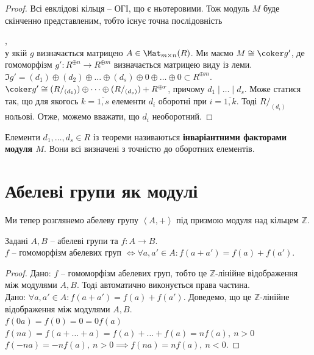 \documentclass{math_library}
\begin{document}
\begin{proof}
Всі евклідові кільця -- ОГІ, що є ньотеровими. Тож модуль $M$ буде скінченно представленим, тобто існує точна послідовність\\ ,\\
у якій $g$ визначається матрицею $A \in \Mat_{m \times n}(R)$. Ми маємо $M \cong \coker g'$, де гомоморфізм $g' \colon R^{\oplus n} \to R^{\oplus m}$ визначається матрицею виду із леми.\\
$\Im g' = (d_1) \oplus (d_2) \oplus \dots \oplus (d_s) \oplus 0 \oplus \dots \oplus 0 \subset R^{\oplus m}$.\\
$\coker g' \cong (R/_{(d_1)}) \oplus \dots \oplus (R/_{(d_s)}) + R^{\oplus r}$, причому $d_1 \mid \dots \mid d_s$. Може статися так, що для якогось $k = \overline{1,s}$ елементи $d_i$ оборотні при $i = \overline{1,k}$. Тоді $R/_{(d_i)}$ нольові. Отже, можемо вважати, що $d_i$ необоротний.
\end{proof}

\begin{definition}
Елементи $d_1,\dots,d_s \in R$ із теореми називаються \textbf{інваріантними факторами модуля $M$}. Вони всі визначені з точністю до оборотних елементів.
\end{definition}

\newpage
\section*{Абелеві групи як модулі}
Ми тепер розглянемо абелеву групу $\left< A, +\right>$ під призмою модуля над кільцем $\mathbb{Z}$.

\begin{theorem*}
Задані $A,B$ -- абелеві групи та $f \colon A \to B$.\\
$f$ -- гомоморфізм абелевих груп $\iff \forall a,a' \in A: f(a+a') = f(a) + f(a')$.
\end{theorem*}

\begin{proof}
\rightproof Дано: $f$ -- гомоморфізм абелевих груп, тобто це $\mathbb{Z}$-лінійне відображення між модулями $A,B$. Тоді автоматично виконується права частина.
\bigskip \\
\leftproof Дано: $\forall a,a' \in A: f(a+a') = f(a) + f(a')$. Доведемо, що це $\mathbb{Z}$-лінійне відображення між модулями $A,B$.\\
$f(0a) = f(0) = 0 = 0f(a)$\\
$f(na) = f(a+\dots + a) = f(a) + \dots + f(a) = n f(a),\ n > 0$\\
$f(-n a) = -n f(a),\ n > 0 \implies f(na) = nf(a),\ n < 0$.
\end{proof}
\end{document}
